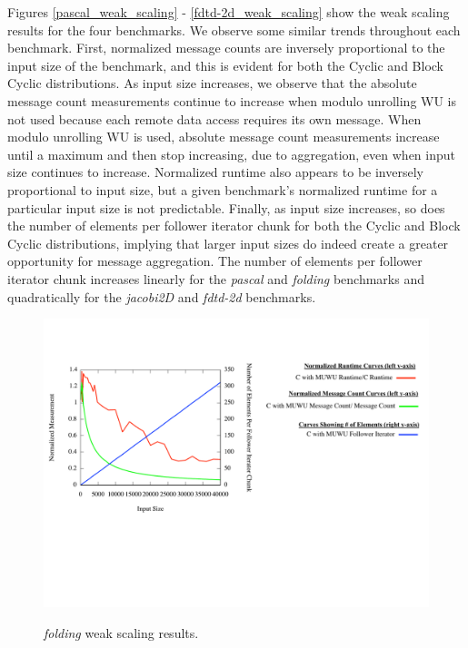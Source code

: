 Figures \ref{pascal_weak_scaling} - \ref{fdtd-2d_weak_scaling} show the weak scaling results for the four benchmarks. We observe some similar trends throughout each benchmark. First, normalized message counts are inversely proportional to the input size of the benchmark, and this is evident for both the Cyclic and Block Cyclic distributions. As input size increases, we observe that the absolute message count measurements continue to increase when modulo unrolling WU is not used because each remote data access requires its own message. When modulo unrolling WU is used, absolute message count measurements increase until a maximum and then stop increasing, due to aggregation, even when input size continues to increase. Normalized runtime also appears to be inversely proportional to input size, but a given benchmark's normalized runtime for a particular input size is not predictable. Finally, as input size increases, so does the number of elements per follower iterator chunk for both the Cyclic and Block Cyclic distributions, implying that larger input sizes do indeed create a greater opportunity for message aggregation. The number of elements per follower iterator chunk increases linearly for the \textit{pascal} and \textit{folding} benchmarks and quadratically for the \textit{jacobi2D} and \textit{fdtd-2d} benchmarks.

\begin{figure}
\begin{center}
\includegraphics[width=\linewidth]{./Figures/input_variation_exp/folding.pdf}
\renewcommand{\baselinestretch}{1}
\small\normalsize
\begin{quote}
\caption[\textit{folding} weak scaling results]{\textit{folding} weak scaling results.\label{folding_weak_scaling}}
\end{quote}
\end{center}
\end{figure}

